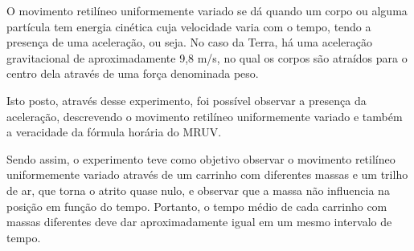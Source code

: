 
O movimento retilíneo uniformemente variado se dá quando um corpo ou alguma partícula tem energia cinética cuja velocidade varia com o tempo, tendo a presença de uma aceleração, ou seja. No caso da Terra, há uma aceleração gravitacional de aproximadamente 9,8 m/s, no qual os corpos são atraídos para o centro dela através de uma força denominada peso. 

Isto posto, através desse experimento, foi possível observar a presença da aceleração, descrevendo o movimento retilíneo uniformemente variado e também a veracidade da fórmula horária do MRUV.

Sendo assim, o experimento teve como objetivo observar o movimento retilíneo uniformemente variado através de um carrinho com diferentes massas e um trilho de ar, que torna o atrito quase nulo, e observar que a massa não influencia na posição em função do tempo. Portanto, o tempo médio de cada carrinho com massas diferentes deve dar aproximadamente igual em um mesmo intervalo de tempo.

